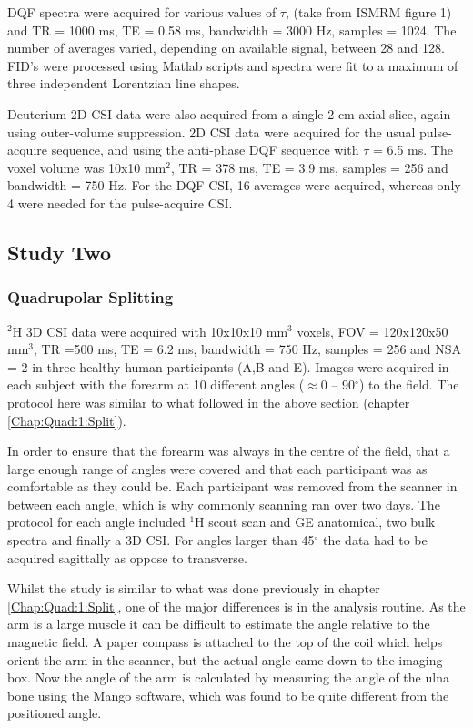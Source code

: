 \documentclass[class=article, crop=false]{standalone}
\begin{document}
DQF spectra were acquired for various values of $\tau$, (take from ISMRM figure 1) and TR = 1000 ms, TE = 0.58 ms, bandwidth = 3000 Hz, samples = 1024. The number of averages varied, depending on available signal, between 28 and 128. FID's were processed using Matlab scripts and spectra were fit to a maximum of three independent Lorentzian line shapes.

Deuterium 2D CSI data were also acquired from a single 2 cm axial slice, again using outer-volume suppression. 2D CSI data were acquired for the usual pulse-acquire sequence, and using the anti-phase DQF sequence with $\tau$ = 6.5 ms. The voxel volume was 10x10 mm$^2$, TR = 378 ms, TE = 3.9 ms, samples = 256 and bandwidth = 750 Hz. For the DQF CSI, 16 averages were acquired, whereas only 4 were needed for the pulse-acquire CSI.

\subsection{Study Two}
\subsubsection{Quadrupolar Splitting}

$^2$H 3D CSI data were acquired with 10x10x10 mm$^3$ voxels, FOV = 120x120x50 mm$^3$, TR =500 ms, TE = 6.2 ms, bandwidth = 750 Hz, samples = 256 and NSA = 2 in three healthy human participants (A,B and E). Images were acquired in each subject with the forearm at 10 different angles ($\approx$0 – 90$^\circ$) to the field. The protocol here was similar to what followed in the above section (chapter \ref{Chap:Quad:1:Split}). 

In order to ensure that the forearm was always in the centre of the field, that a large enough range of angles were covered and that each participant was as comfortable as they could be. Each participant was removed from the scanner in between each angle, which is why commonly scanning ran over two days. The protocol for each angle included $^1$H scout scan and GE anatomical, two bulk spectra and finally a 3D CSI. For angles larger than 45$^\circ$ the data had to be acquired sagittally as oppose to transverse.

Whilst the study is similar to what was done previously in chapter \ref{Chap:Quad:1:Split}, one of the major differences is in the analysis routine. As the arm is a large muscle it can be difficult to estimate the angle relative to the magnetic field. A paper compass is attached to the top of the coil which helps orient the arm in the scanner, but the actual angle came down to the imaging box. Now the angle of the arm is calculated by measuring the angle of the ulna bone using the Mango software, which was found to be quite different from the positioned angle.
\end{document}
